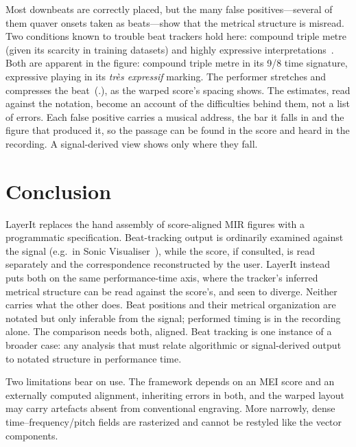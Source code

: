 \documentclass{article}
\begin{document}
Most downbeats are correctly placed, but the many false positives---several of them quaver onsets taken as beats---show that the metrical structure is misread.
Two conditions known to trouble beat trackers hold here: compound triple metre (given its scarcity in training datasets) and highly expressive interpretations~\cite{pinto2021TappingDifficultOnes}.
Both are apparent in the figure: compound triple metre in its 9/8 time signature, expressive playing in its \emph{très expressif} marking. The performer stretches and compresses the beat~(\musQuarter.), as the warped score's spacing shows.
The estimates, read against the notation, become an account of the difficulties behind them, not a list of errors. Each false positive carries a musical address, the bar it falls in and the figure that produced it, so the passage can be found in the score and heard in the recording. A signal-derived view shows only where they fall.
\section{Conclusion}\label{sec:conclusion}

LayerIt replaces the hand assembly of score-aligned MIR figures with a programmatic specification. Beat-tracking output is ordinarily examined against the signal (e.g.\ in Sonic Visualiser~\cite{cannam2010SonicVisualiserOpen}), while the score, if consulted, is read separately and the correspondence reconstructed by the user.
LayerIt instead puts both on the same performance-time axis, where the tracker’s inferred metrical structure can be read against the score’s, and seen to diverge. Neither carries what the other does. Beat positions and their metrical organization are notated but only inferable from the signal; performed timing is in the recording alone. The comparison needs both, aligned. Beat tracking is one instance of a broader case: any analysis that must relate algorithmic or signal-derived output to notated structure in performance time.

Two limitations bear on use. The framework depends on an MEI score and an externally computed alignment, inheriting errors in both, and the warped layout may carry artefacts absent from conventional engraving. More narrowly, dense time--frequency/pitch fields are rasterized and cannot be restyled like the vector components.
\end{document}
